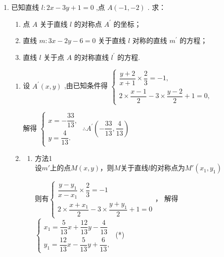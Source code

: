 \begin{enumerate}
    \item 已知直线 $l : {2x} - {3y} + 1 = 0$ ,点 $A\left( {-1, - 2}\right)$ . 求：
    \begin{enumerate}
        \item 点 $A$ 关于直线 $l$ 的对称点 ${A}^{\prime }$ 的坐标；
        \item 直线 $m : {3x} - {2y} - 6 = 0$ 关于直线 $l$ 对称的直线 ${m}^{\prime }$ 的方程；
        \item 直线 $l$ 关于点 $A$ 的对称直线 ${l}^{\prime }$ 的方程.
    \end{enumerate}
    \begin{jieda}
        \begin{enumerate}
            \item 设 ${A}^{\prime }\left( {x,y}\right)$ ,由已知条件得
            $\left\{  \begin{array}{l} \dfrac{y + 2}{x + 1} \times  \dfrac{2}{3} =  - 1, \\  2 \times  \dfrac{x - 1}{2} - 3 \times  \dfrac{y - 2}{2} + 1 = 0, \end{array}\right.$
            
            解得 $\left\{  {\begin{array}{l} x =  - \dfrac{33}{13}, \\  y = \dfrac{4}{13}. \end{array}\;\therefore {A}^{\prime }\left( {-\dfrac{33}{13},\dfrac{4}{13}}\right) }\right.$
            \item
            \begin{enumerate}[(1)]
                \item 方法1\\
                设$m'$上的点$M(x, y)$，则$M$关于直线$l$的对称点为$M'(x_1, y_1)$
                
                则有$\left\{\begin{array}{l}
                    \dfrac{y-y_1}{x-x_1} \times \dfrac{2}{3} = -1 \\
                    2 \times \dfrac{x+x_1}{2} - 3 \times \dfrac{y+y_1}{2} + 1 = 0
                \end{array}\right.$，
                解得 $\left\{  \begin{array}{l} 
                    x_1 = \dfrac{5}{13}x+\dfrac{12}{13}y-\dfrac{4}{13} \\  
                    y_1 = \dfrac{12}{13}x-\dfrac{5}{13}y+\dfrac{6}{13}, 
                    \end{array}\right.$ (*)
                

\end{enumerate}
\end{enumerate}
\end{jieda}
\end{enumerate}
